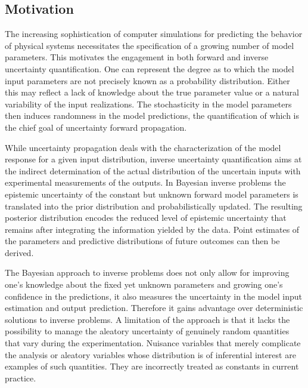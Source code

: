 \begin{refsection}

\section{Motivation}
The increasing sophistication of computer simulations for predicting the behavior of physical systems necessitates the specification of a growing number of model parameters.
This motivates the engagement in both forward and inverse uncertainty quantification.
One can represent the degree as to which the model input parameters are not precisely known as a probability distribution.
Either this may reflect a lack of knowledge about the true parameter value or a natural variability of the input realizations.
The stochasticity in the model parameters then induces randomness in the model predictions, the quantification of which is the chief goal of uncertainty forward propagation.
\par %
While uncertainty propagation deals with the characterization of the model response for a given input distribution,
inverse uncertainty quantification aims at the indirect determination of the actual distribution of the uncertain inputs with experimental measurements of the outputs.
In Bayesian inverse problems the epistemic uncertainty of the constant but unknown forward model parameters is translated into the prior distribution and probabilistically updated.
The resulting posterior distribution encodes the reduced level of epistemic uncertainty that remains after integrating the information yielded by the data.
Point estimates of the parameters and predictive distributions of future outcomes can then be derived.
\par %
The Bayesian approach to inverse problems does not only allow for improving one's knowledge about the fixed yet unknown parameters and growing one's confidence in the predictions,
it also measures the uncertainty in the model input estimation and output prediction.
Therefore it gains advantage over deterministic solutions to inverse problems.
A limitation of the approach is that it lacks the possibility to manage the aleatory uncertainty of genuinely random quantities that vary during the experimentation.
Nuisance variables that merely complicate the analysis or aleatory variables whose distribution is of inferential interest are examples of such quantities.
They are incorrectly treated as constants in current practice.

\end{refsection}

